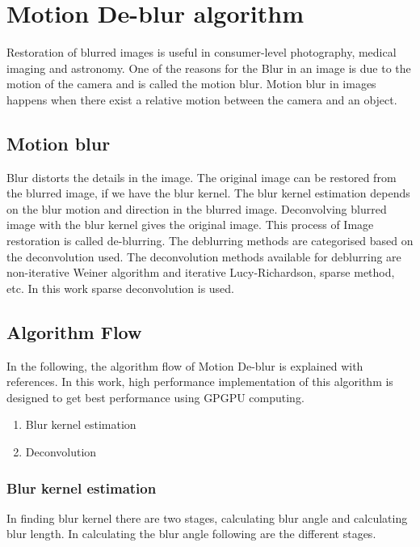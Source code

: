\section{Motion De-blur algorithm}
Restoration of blurred images is useful in consumer-level photography, medical imaging and astronomy. One of the reasons for the Blur in an image is due to the motion of the camera and is called the motion blur. Motion blur in images happens when there exist a relative motion between the camera and an object. 
\subsection{Motion blur}
Blur distorts the details in the image. The original image can be restored from the blurred image, if we have the blur kernel. The blur kernel estimation depends on the blur motion and direction in the blurred image. Deconvolving blurred image with the blur kernel gives the original image. This process of Image restoration is called de-blurring. The deblurring methods are categorised based on the deconvolution used. The deconvolution methods available for deblurring are non-iterative Weiner algorithm \cite{Blurred image restoration} and iterative Lucy-Richardson, sparse method, etc. In this work sparse deconvolution is used.
\subsection{Algorithm Flow}
In the following, the algorithm flow of Motion De-blur is explained with references. In this work, high performance implementation of this algorithm is designed to get best performance using GPGPU computing. 
\begin{enumerate}
	\item Blur kernel estimation
	\item Deconvolution 
\end{enumerate}
\subsubsection{Blur kernel estimation}
In finding blur kernel there are two stages, calculating blur angle and calculating blur length. In calculating the blur angle following are the different stages.

